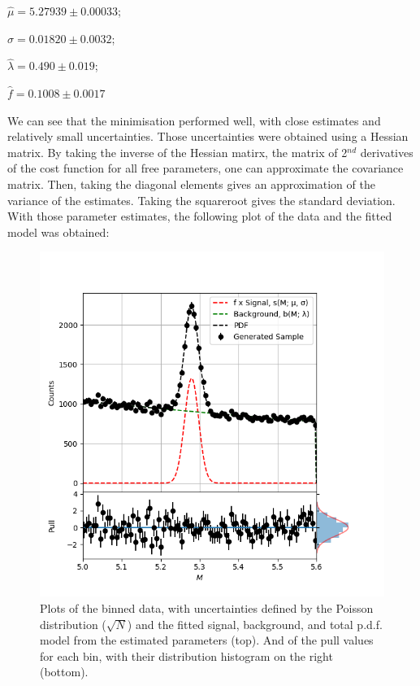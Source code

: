 \documentclass[12pt]{report} %
\begin{document}
\begin{center}
    $\hat{\mu} = 5.27939 \pm 0.00033$;  

    $\hat{\sigma} = 0.01820 \pm 0.0032$;  
    
    $\hat{\lambda} = 0.490 \pm 0.019$;  

    $\hat{f} = 0.1008 \pm 0.0017$
\end{center}

We can see that the minimisation performed well, with close estimates and relatively small uncertainties. Those uncertainties were obtained using a Hessian matrix. By taking the inverse of the Hessian matirx, the matrix of 2$^{nd}$ derivatives of the cost function for all free parameters, one can approximate the covariance matrix. Then, taking the diagonal elements gives an approximation of the variance of the estimates. Taking the squareroot gives the standard deviation. With those parameter estimates, the following plot of the data and the fitted model was obtained:

\begin{figure}[tp]
    \centering
    \includegraphics[width=\textwidth]{../plots/plot_pdf_e.png}
    \captionsetup{margin=1.3cm}
    \caption[width=0.2\pdfpagewidth]{Plots of the binned data, with uncertainties defined by the Poisson distribution ($\sqrt{N}$) and the fitted signal, background, and total p.d.f. model from the estimated parameters (top). And of the pull values for each bin, with their distribution histogram on the right (bottom).}
\end{figure}
\end{document}
